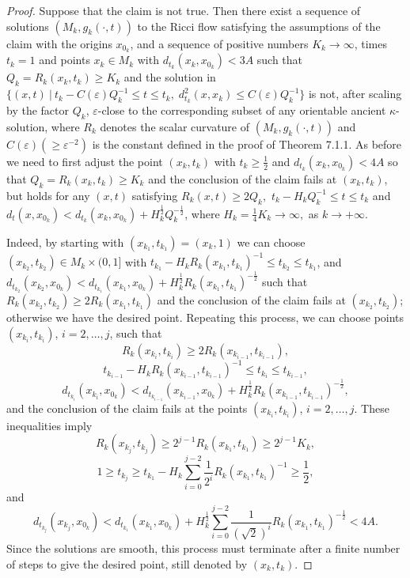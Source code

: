 \begin{proof}
Suppose that the claim is not true. Then there exist a sequence of
solutions $(M_k,g_k(\cdot,t))$ to the Ricci flow satisfying the
assumptions of the claim with the origins $x_{0_k}$, and a
sequence of positive numbers $K_k\rightarrow\infty$, times $t_k=1$
and points $x_k\in M_k$ with $d_{t_k}(x_k,x_{0_k})<3A$ such that
$Q_k=R_k(x_k,t_k)\ge K_k$ and the solution in $\{(x,t)\ |\
t_k-C(\varepsilon)Q_k^{-1}\le t\le t_k,\;d_{t_k}^2(x,x_k)\le
C(\varepsilon)Q_k^{-1}\}$ is not, after scaling by the factor
$Q_k$, $\varepsilon$-close to the corresponding subset of any
orientable ancient $\kappa$-solution, where $R_k$ denotes the
scalar curvature of $(M_k,g_k(\cdot,t))$ and $C(\varepsilon)(\geq
\varepsilon^{-2})$ is the constant defined in the proof of Theorem
7.1.1. As before we need to first adjust the point $(x_k,t_k)$
with $t_k\ge\frac{1}{2}$ and $d_{t_k}(x_k,x_{0_k})<4A$ so that
$Q_k=R_k(x_k,t_k)\ge K_k$ and the conclusion of the claim fails at
$(x_k,t_k)$, but holds for any $(x,t)$ satisfying $R_k(x,t)\ge
2Q_k,$ $t_k-H_kQ_k^{-1}\le t\le t_k$ and
$d_t(x,x_{0_k})<d_{t_k}(x_k,x_{0_k})
+H_k^{\frac{1}{2}}Q_k^{-\frac{1}{2}}$, where
$H_k=\frac{1}{4}K_k\rightarrow\infty,$ as $k\rightarrow+\infty$.

Indeed, by starting with $(x_{k_1},t_{k_1})=(x_k,1)$ we can choose
$(x_{k_2},t_{k_2})\in M_k\times (0,1]$ with
$t_{k_1}-H_kR_k(x_{k_1},t_{k_1})^{-1}\le t_{k_2}\le t_{k_1}$, and
$d_{t_{k_2}}(x_{k_2},x_{0_k})<d_{t_{k_1}}(x_{k_1},x_{0_k})
+H_k^\frac{1}{2}R_k(x_{k_1},t_{k_1})^{-\frac{1}{2}}$ such that
$R_k(x_{k_2},t_{k_2})\ge 2R_k(x_{k_1},t_{k_1})$ and the conclusion
of the claim fails at $(x_{k_2},t_{k_2})$; otherwise we have the
desired point. Repeating this process, we can choose points
$(x_{k_i},t_{k_i})$, $i=2, \ldots, j$, such that
$$
R_k(x_{k_i},t_{k_i})\ge 2R_k(x_{k_{i-1}},t_{k_{i-1}}),
$$
$$
t_{k_{i-1}}-H_kR_k(x_{k_{i-1}},t_{k_{i-1}})^{-1} \le t_{k_{i}}\le
t_{k_{i-1}},
$$
$$
d_{t_{k_{i}}}(x_{k_{i}},x_{0_{k}})
<d_{t_{k_{i-1}}}(x_{k_{i-1}},x_{0_k})+H_k^\frac{1}{2}
R_k(x_{k_{i-1}},t_{k_{i-1}})^{-\frac{1}{2}},
$$
and the conclusion of the claim fails at the points
$(x_{k_i},t_{k_i})$, $i=2, \ldots, j$. These inequalities imply
$$
R_k(x_{k_{j}},t_{k_{j}})\ge 2^{j-1}R_k(x_{k_1},t_{k_1})\ge
2^{j-1}K_k,
$$
$$
1\ge t_{k_{j}}\ge t_{k_{1}}
-H_k\sum_{i=0}^{j-2}\frac{1}{2^i}R_k(x_{k_1},t_{k_1})^{-1}
\ge\frac{1}{2},
$$
and
$$
d_{t_{k_{j}}}(x_{k_j},x_{0_k}) <d_{t_{k_1}}(x_{k_1},x_{0_k})
+H_k^\frac{1}{2}\sum_{i=0}^{j-2}\frac{1}{(\sqrt{2})^i}
R_k(x_{k_1},t_{k_1})^{-\frac{1}{2}}<4A.
$$
Since the solutions are smooth, this process must terminate after
a finite number of steps to give the desired point, still denoted
by $(x_k,t_k).$


\end{proof}
